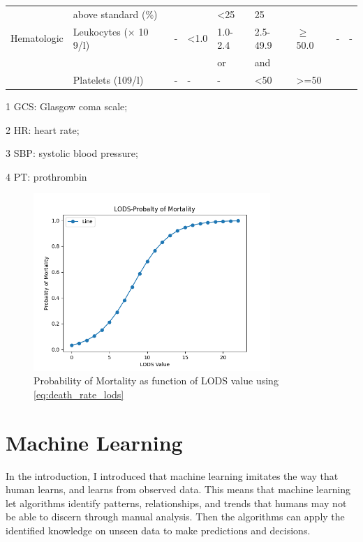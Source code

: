 \documentclass[12pt,a4paper,english
]{tunithesis}
\begin{document}
\begin{landscape}
\begin{table}[ht]
\begin{threeparttable}
\begin{tabular}{lllllllll}
             & above standard (\%) &  &  & \textless{}25 & 25 &  &  &  \\
            Hematologic & Leukocytes (× 10 9/l) & - & \textless{}1.0 & 1.0-2.4 & 2.5-49.9 & $\geq$50.0 & - & - \\
             &  &  &  & or & and &  &  &  \\
             & Platelets (109/l) & - & - & - & \textless{}50 & \textgreater{}=50 &  &  \\
             \hline
        \end{tabular}
        \begin{tablenotes}
            \item[1] GCS: Glasgow coma scale; 
            \item[2] HR: heart rate; 
            \item[3] SBP: systolic blood pressure;        
            \item[4] PT: prothrombin
        \end{tablenotes}
        \end{threeparttable}
    \end{table}
\end{landscape}

\begin{figure}
  \begin{center}
    \includegraphics[width=0.8\textwidth]{thesis/img/lod_mortality_1.png}
    
  \end{center}
  \caption[LODS-Probability of Mortality]{Probability of Mortality as function of LODS value using \ref{eq:death_rate_lods}}
  \label{fig:lods_mortality}
\end{figure}



\section{Machine Learning}
In the introduction, I introduced that machine learning imitates the way that human learns, and learns from observed data. This means that machine learning let algorithms identify patterns, relationships, and trends that humans may not be able to discern through manual analysis. Then the algorithms can apply the identified knowledge on unseen data to make predictions and decisions. 
\end{document}
